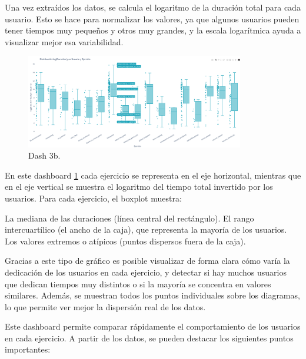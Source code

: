 \documentclass[a4paper, 12pt]{book}
\begin{document}
Una vez extraídos los datos, se calcula el logaritmo de la duración total para cada usuario. Esto se hace para normalizar los valores, ya que algunos usuarios pueden tener tiempos muy pequeños y otros muy grandes, y la escala logarítmica ayuda a visualizar mejor esa variabilidad.

\begin{figure}
  \centering
  \includegraphics[width=0.85\textwidth, keepaspectratio]{img/3bb.png}
  \caption{Dash 3b.}\label{fig:3b}
\end{figure}

En este dashboard \ref{fig:3b} cada ejercicio se representa en el eje horizontal, mientras que en el eje vertical se muestra el logaritmo del tiempo total invertido por los usuarios. Para cada ejercicio, el boxplot muestra:

La mediana de las duraciones (línea central del rectángulo).
El rango intercuartílico (el ancho de la caja), que representa la mayoría de los usuarios.
Los valores extremos o atípicos (puntos dispersos fuera de la caja).

Gracias a este tipo de gráfico es posible visualizar de forma clara cómo varía la dedicación de los usuarios en cada ejercicio, y detectar si hay muchos usuarios que dedican tiempos muy distintos o si la mayoría se concentra en valores similares. Además, se muestran todos los puntos individuales sobre los diagramas, lo que permite ver mejor la dispersión real de los datos.

Este dashboard permite comparar rápidamente el comportamiento de los usuarios en cada ejercicio. A partir de los datos, se pueden destacar los siguientes puntos importantes:
\end{document}
